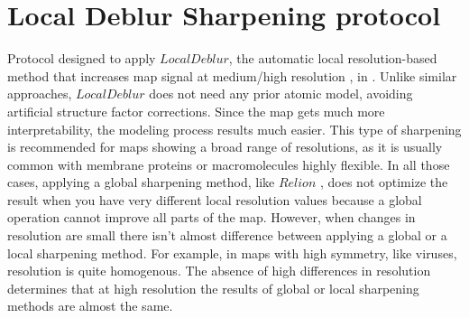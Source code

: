 \section{Local Deblur Sharpening protocol}
\label{app:localDeblurSharpening}%

Protocol designed to apply $LocalDeblur$, the automatic local resolution-based method that increases map signal at medium/high resolution \citep{ramirez2018}, in \scipion. Unlike similar approaches, $LocalDeblur$ does not need any prior atomic model, avoiding artificial structure factor corrections. Since the map gets much more interpretability, the modeling process results much easier. This type of sharpening is recommended for maps showing a broad range of resolutions, as it is usually common with membrane proteins or macromolecules highly flexible. In all those cases, applying a global sharpening method, like $Relion$ , does not optimize the result when you have very different local resolution values because a global operation cannot improve all parts of the map. However, when changes in resolution are small there isn't almost difference between applying a global or a local sharpening method. For example, in maps with high symmetry, like viruses, resolution is quite homogenous. The absence of high differences in resolution determines that at high resolution the results of global or local sharpening methods are almost the same. 

